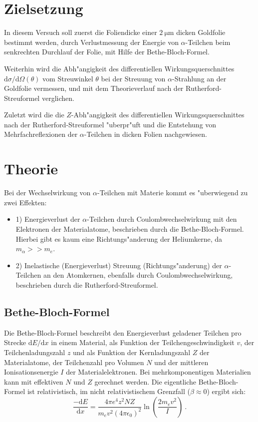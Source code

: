 \section{Zielsetzung}
  In diesem Versuch soll zuerst die Foliendicke einer $\SI{2}{\micro\meter}$ dicken Goldfolie bestimmt werden, durch Verlustmessung der Energie von $\alpha$-Teilchen beim senkrechten Durchlauf der Folie, mit Hilfe der Bethe-Bloch-Formel.

  Weiterhin wird die Abh"angigkeit des differentiellen Wirkungsquerschnittes $\text{d}\sigma/\text{d}\Omega(\theta)$ vom Streuwinkel $\theta$ bei der Streuung von $\alpha$-Strahlung an der Goldfolie vermessen, und mit dem Theorieverlauf nach der Rutherford-Streuformel verglichen.

  Zuletzt wird die die $Z$-Abh"angigkeit des differentiellen Wirkungsquerschnittes nach der Rutherford-Streuformel "uberpr"uft und die Entstehung von Mehrfachreflexionen der $\alpha$-Teilchen in dicken Folien nachgewiesen.

\section{Theorie}
  \label{sec:Theorie}
  Bei der Wechselwirkung von $\alpha$-Teilchen mit Materie kommt es "uberwiegend zu zwei Effekten:
  \begin{itemize}
    \item 1) Energieverlust der $\alpha$-Teilchen durch Coulombwechselwirkung mit den Elektronen der Materialatome, beschrieben durch die Bethe-Bloch-Formel. Hierbei gibt es kaum eine Richtungs"anderung der Heliumkerne, da $m_{\alpha}>>m_e$.
    \item 2) Inelastische (Energieverlust) Streuung (Richtungs"anderung) der $\alpha$-Teilchen an den Atomkernen, ebenfalls durch Coulombwechselwirkung, beschrieben durch die Rutherford-Streuformel.
  \end{itemize}


  \subsection{Bethe-Bloch-Formel}
    Die Bethe-Bloch-Formel beschreibt den Energieverlust geladener Teilchen pro Strecke $\text{d}E/\text{d}x$ in einem Material, als Funktion der Teilchengeschwindigkeit $v$, der Teilchenladungszahl $z$ und als Funktion der Kernladungszahl $Z$ der Materialatome, der Teilchenzahl pro Volumen $N$ und der mittleren Ionisationsenergie $I$ der Materialelektronen.
    Bei mehrkomponentigen Materialien kann mit effektiven $N$ und $Z$ gerechnet werden.
    Die eigentliche Bethe-Bloch-Formel ist relativistisch, im nicht relativistischem Grenzfall ($\beta \approx 0$) ergibt sich:
    \begin{equation}
      \frac{-\text{d}E}{\text{d}x} = \frac{4\pi e^4z^2NZ}{m_ev^2(4\pi \epsilon_0)^2}\ln \left(\frac{2m_ev^2}{I}\right) \: .
    \end{equation}


